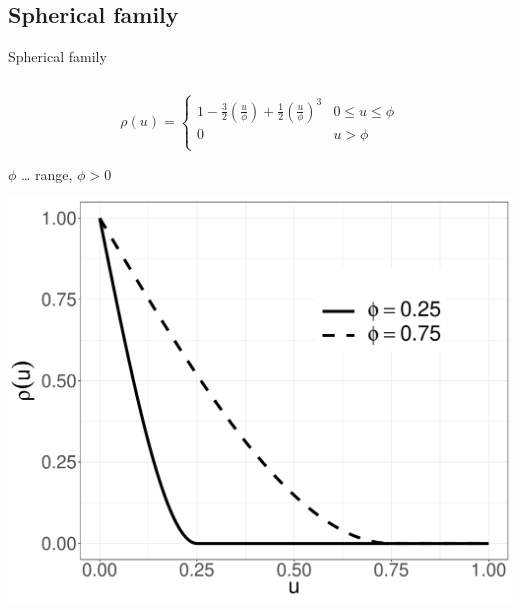 \documentclass[
  ignorenonframetext,
]{beamer}
\begin{document}
\hypertarget{spherical-family}{%
\subsection{Spherical family}\label{spherical-family}}

\begin{frame}{Spherical family}
\begin{columns}[T]
\begin{column}{0.5\textwidth}
\small

\[
\rho(u)= \left\{
\begin{array}{ll}
      1-\frac{3}{2}\left(\frac{u}{\phi}\right)+\frac{1}{2}\left(\frac{u}{\phi}\right)^3 & 0\leq u \leq \phi \\
      0 & u > \phi\\
\end{array} 
\right. 
\]

\(\phi\) \ldots{} range, \(\phi>0\)

\includegraphics{Lecture_1_files/figure-beamer/unnamed-chunk-45-1.pdf}
\end{column}


\end{columns}
\end{frame}
\end{document}

